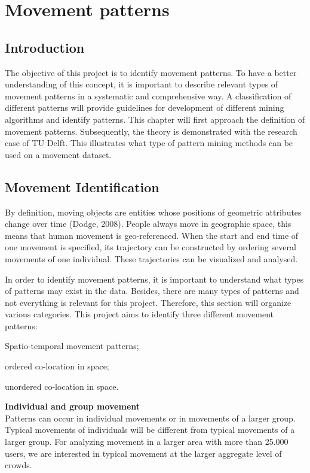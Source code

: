 \chapter{Movement patterns}
\section{Introduction}
The objective of this project is to identify movement patterns. To have a better understanding of this concept, it is important to describe relevant types of movement patterns in a systematic and comprehensive way. A classification of different patterns will provide guidelines for development of different mining algorithms and identify patterns. This chapter will first approach the definition of movement patterns. Subsequently, the theory is demonstrated with the research case of TU Delft. This illustrates what type of pattern mining methods can be used on a movement dataset. 

\section{Movement Identification}
By definition, moving objects are entities whose positions of geometric attributes change over time (Dodge, 2008). People always move in geographic space, this means that human movement is geo-referenced. When the start and end time of one movement is specified, its trajectory can be constructed by ordering several movements of one individual. These trajectories can be visualized and analysed.

In order to identify movement patterns, it is important to understand what types of patterns may exist in the data. Besides, there are many types of patterns and not everything is relevant for this project. Therefore, this section will organize various categories. This project aims to identify three different movement patterns: \begin {enumerate*} [label=\itshape\arabic*\upshape),font={\color{red!0!black}\bfseries}] \item Spatio-temporal movement patterns; \item ordered co-location in space; \item unordered co-location in space.
\end {enumerate*}

\textbf{Individual and group movement}\\
Patterns can occur in individual movements or in movements of a larger group. Typical movements of individuals will be different from typical movements of a larger group. For analyzing movement in a larger area with more than 25.000 users, we are interested in typical movement at the larger aggregate level of crowds. 

